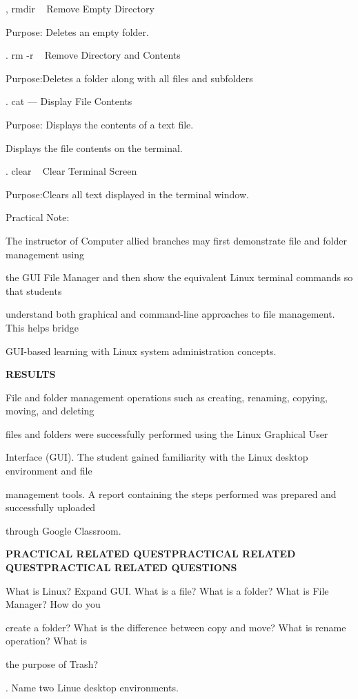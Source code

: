 \documentclass[10pt,a4paper]{article}
\begin{document}
, rmdir ~ Remove Empty Directory\par
\noindent Purpose: Deletes an empty folder.\par
{}. rm -r ~ Remove Directory and Contents\par
\noindent Purpose:Deletes a folder along with all files and subfolders\par
{}. cat — Display File Contents\par
\noindent Purpose: Displays the contents of a text file.\par
\noindent Displays the file contents on the terminal.\par
{}. clear ~ Clear Terminal Screen\par
\noindent Purpose:Clears all text displayed in the terminal window.\par

\noindent Practical Note:\par
\noindent The instructor of Computer allied branches may first demonstrate file and folder management using\par
\noindent the GUI File Manager and then show the equivalent Linux terminal commands so that students\par
\noindent understand both graphical and command-line approaches to file management. This helps bridge\par
\noindent GUI-based learning with Linux system administration concepts.\par

\medskip\noindent\textbf{RESULTS}\par
\noindent File and folder management operations such as creating, renaming, copying, moving, and deleting\par
\noindent files and folders were successfully performed using the Linux Graphical User\par
\noindent Interface (GUI). The student gained familiarity with the Linux desktop environment and file\par
\noindent management tools. A report containing the steps performed was prepared and successfully uploaded\par
\noindent through Google Classroom.\par
\clearpage
\medskip\noindent\textbf{PRACTICAL RELATED QUESTPRACTICAL RELATED QUESTPRACTICAL RELATED QUESTIONS}\par
\noindent What is Linux? Expand GUI. What is a file? What is a folder? What is File Manager? How do you\par
\noindent create a folder? What is the difference between copy and move? What is rename operation? What is\par
\noindent the purpose of Trash?\par
{}. Name two Linue desktop environments.\par
\end{document}
